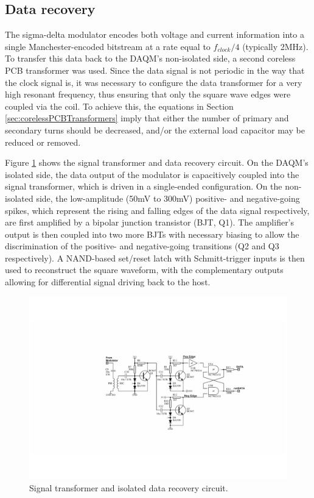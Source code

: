 \documentclass[conference]{IEEEtran}
\begin{document}
	\subsection{Data recovery}
	The sigma-delta modulator encodes both voltage and current information into a single Manchester-encoded bitstream at a rate equal to $ f_{clock}/4 $ (typically 2MHz).  To transfer this data back to the DAQM's non-isolated side, a second coreless PCB transformer was used.  Since the data signal is not periodic in the way that the clock signal is, it was necessary to configure the data transformer for a very high resonant frequency, thus ensuring that only the square wave edges were coupled via the coil.  To achieve this, the equations in Section \ref{sec:corelessPCBTransformers} imply that either the number of primary and secondary turns should be decreased, and/or the external load capacitor may be reduced or removed.
	
	Figure \ref{fig:TFdat} shows the signal transformer and data recovery circuit.  On the DAQM's isolated side, the data output of the modulator is capacitively coupled into the signal transformer, which is driven in a single-ended configuration.  On the non-isolated side, the low-amplitude (50mV to 300mV) positive- and negative-going spikes, which represent the rising and falling edges of the data signal respectively, are first amplified by a bipolar junction transistor (BJT, Q1). The amplifier's output is then coupled into two more BJTs with necessary biasing to allow the discrimination of the positive- and negative-going transitions (Q2 and Q3 respectively). A NAND-based set/reset latch with Schmitt-trigger inputs is then used to reconstruct the square waveform, with the complementary outputs allowing for differential signal driving back to the host.  
%
	\begin{figure}[t]
		\centering
		\includegraphics[width=1\columnwidth]{./img/TFdat_BW}
		\caption{Signal transformer and isolated data recovery circuit.}
		\label{fig:TFdat}
	\end{figure}
%	
\end{document}
